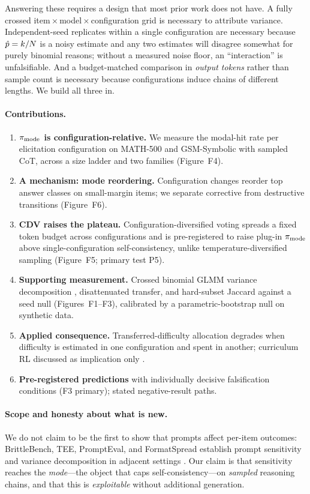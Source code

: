 Answering these requires a design that most prior work does not have. A fully
crossed item\,$\times$\,model\,$\times$\,configuration grid is necessary to
attribute variance. Independent-seed replicates within a single configuration
are necessary because $\hat{p} = k/N$ is a noisy estimate and any two estimates
will disagree somewhat for purely binomial reasons; without a measured noise
floor, an ``interaction'' is unfalsifiable. And a budget-matched comparison in
\emph{output tokens} rather than sample count is necessary because
configurations induce chains of different lengths. We build all three in.

\paragraph{Contributions.}
\begin{enumerate}\itemsep2pt
  \item \textbf{$\pi_{\mathrm{mode}}$ is configuration-relative.} We measure the modal-hit
    rate per elicitation configuration on MATH-500 and GSM-Symbolic with sampled
    CoT, across a size ladder and two families (Figure~F4).
  \item \textbf{A mechanism: mode reordering.} Configuration changes reorder top
    answer classes on small-margin items; we separate corrective from
    destructive transitions (Figure~F6).
  \item \textbf{CDV raises the plateau.} Configuration-diversified voting spreads
    a fixed token budget across configurations and is pre-registered to raise
    plug-in $\pi_{\mathrm{mode}}$ above single-configuration self-consistency, unlike
    temperature-diversified sampling (Figure~F5; primary test P5).
  \item \textbf{Supporting measurement.} Crossed binomial GLMM variance
    decomposition \citep{tee2026}, disattenuated transfer, and hard-subset
    Jaccard against a seed null (Figures~F1--F3), calibrated by a
    parametric-bootstrap null on synthetic data.
  \item \textbf{Applied consequence.} Transferred-difficulty allocation degrades
    when difficulty is estimated in one configuration and spent in another; curriculum
    RL discussed as implication only \citep{hardunreached2026}.
  \item \textbf{Pre-registered predictions} with individually decisive
    falsification conditions (F3 primary); stated negative-result paths.
\end{enumerate}

\paragraph{Scope and honesty about what is new.} We do not claim to be the first
to show that prompts affect per-item outcomes: BrittleBench, TEE, PromptEval,
and FormatSpread establish prompt sensitivity and variance decomposition in
adjacent settings \citep{brittlebench2026,tee2026,prompteval2024,sclar2024formatspread,mizrahi2024multiprompt}.
Our claim is that sensitivity reaches the \emph{mode}---the object that caps
self-consistency---on \emph{sampled} reasoning chains, and that this is
\emph{exploitable} without additional generation.

